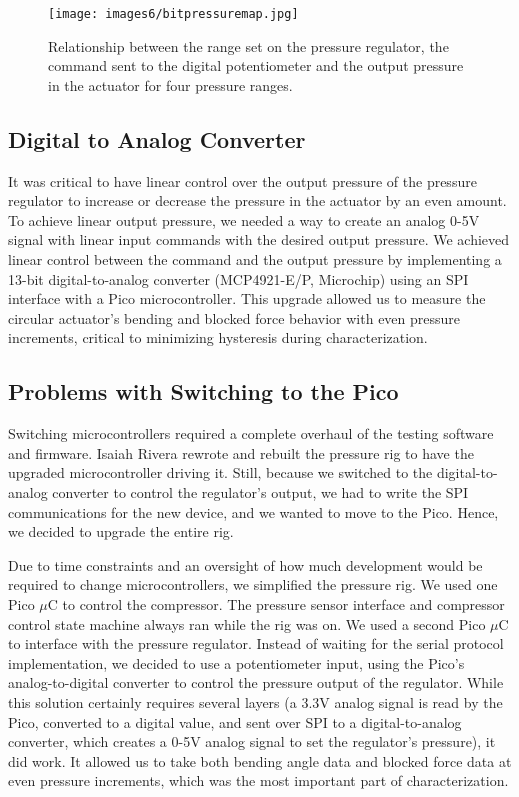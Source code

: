 \begin{figure}[ht]
    \centering
    \texttt{[image: images6/bitpressuremap.jpg]}
    \caption{Relationship between the range set on the pressure regulator, the command sent to the digital potentiometer and the output pressure in the actuator for four pressure ranges.}
    \label{fig:bitpressuremap}
\end{figure}

\clearpage
\subsection{Digital to Analog Converter}

It was critical to have linear control over the output pressure of the pressure regulator to increase or decrease the pressure in the actuator by an even amount. To achieve linear output pressure, we needed a way to create an analog 0-5V signal with linear input commands with the desired output pressure. We achieved linear control between the command and the output pressure by implementing a 13-bit digital-to-analog converter (MCP4921-E/P, Microchip) using an SPI interface with a Pico microcontroller. This upgrade allowed us to measure the circular actuator's bending and blocked force behavior with even pressure increments, critical to minimizing hysteresis during characterization. 

\subsection{Problems with Switching to the Pico}

Switching microcontrollers required a complete overhaul of the testing software and firmware. Isaiah Rivera rewrote and rebuilt the pressure rig to have the upgraded microcontroller driving it. Still, because we switched to the digital-to-analog converter to control the regulator's output, we had to write the SPI communications for the new device, and we wanted to move to the Pico. Hence, we decided to upgrade the entire rig. 

Due to time constraints and an oversight of how much development would be required to change microcontrollers, we simplified the pressure rig. We used one Pico $\mu$C to control the compressor. The pressure sensor interface and compressor control state machine always ran while the rig was on. We used a second Pico $\mu$C to interface with the pressure regulator. Instead of waiting for the serial protocol implementation, we decided to use a potentiometer input, using the Pico's analog-to-digital converter to control the pressure output of the regulator. While this solution certainly requires several layers (a 3.3V analog signal is read by the Pico, converted to a digital value, and sent over SPI to a digital-to-analog converter, which creates a 0-5V analog signal to set the regulator's pressure), it did work. It allowed us to take both bending angle data and blocked force data at even pressure increments, which was the most important part of characterization. 

